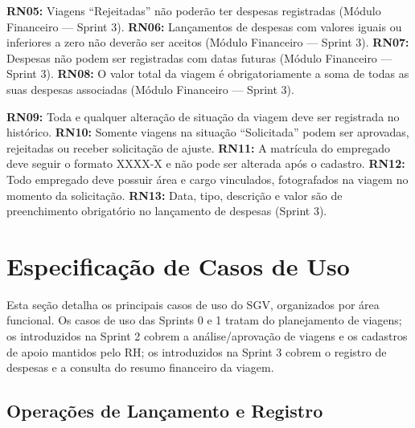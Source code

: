 \documentclass[12pt,article,oneside,a4paper]{abntex2}
\begin{document}
\textbf{RN05:} Viagens ``Rejeitadas'' não poderão ter despesas registradas
(Módulo Financeiro --- Sprint 3).
\textbf{RN06:} Lançamentos de despesas com valores iguais ou inferiores a
zero não deverão ser aceitos (Módulo Financeiro --- Sprint 3).
\textbf{RN07:} Despesas não podem ser registradas com datas futuras (Módulo
Financeiro --- Sprint 3).
\textbf{RN08:} O valor total da viagem é obrigatoriamente a soma de todas as
suas despesas associadas (Módulo Financeiro --- Sprint 3).

\textbf{RN09:} Toda e qualquer alteração de situação da viagem deve ser
registrada no histórico.
\textbf{RN10:} Somente viagens na situação ``Solicitada'' podem ser
aprovadas, rejeitadas ou receber solicitação de ajuste.
\textbf{RN11:} A matrícula do empregado deve seguir o formato XXXX-X e não
pode ser alterada após o cadastro.
\textbf{RN12:} Todo empregado deve possuir área e cargo vinculados,
fotografados na viagem no momento da solicitação.
\textbf{RN13:} Data, tipo, descrição e valor são de preenchimento obrigatório
no lançamento de despesas (Sprint 3).

\section{Especificação de Casos de Uso}

Esta seção detalha os principais casos de uso do SGV, organizados por área
funcional. Os casos de uso das Sprints 0 e 1 tratam do planejamento de
viagens; os introduzidos na Sprint 2 cobrem a análise/aprovação de viagens e
os cadastros de apoio mantidos pelo RH; os introduzidos na Sprint 3 cobrem o
registro de despesas e a consulta do resumo financeiro da viagem.

\subsection{Operações de Lançamento e Registro}
\end{document}

